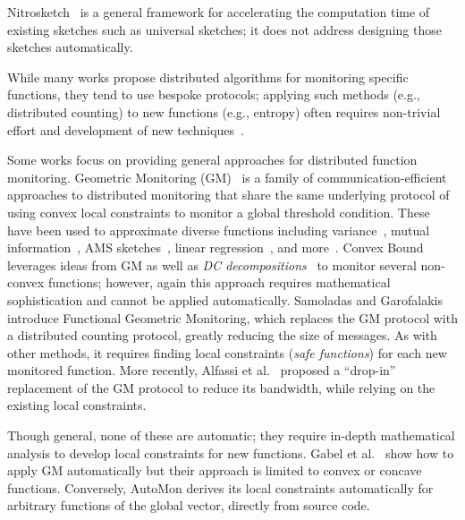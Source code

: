 Nitrosketch~\cite{2019_nitrosketch} is a general framework for accelerating the computation time of existing sketches such as universal sketches; it does not address designing those sketches automatically.


While many works propose distributed algorithms for monitoring specific functions, they tend to use bespoke protocols; applying such methods (e.g., distributed counting) to new functions (e.g., entropy) often requires non-trivial effort and development of new techniques~\cite{cormode2013}.


Some works focus on providing general approaches for distributed function monitoring.
Geometric Monitoring (GM)~\cite{2008_shape_sensitive_gm,lazerson:one_for_all} is a family of communication-efficient approaches to distributed monitoring that share the same underlying protocol of using convex local constraints to monitor a global threshold condition.
These have been used to approximate diverse functions including variance~\cite{gabel:variance_monitoring}, mutual information~\cite{giatrakos2012prediction}, AMS sketches~\cite{garofalakis2013sketch}, linear regression~\cite{gabel:monitoring_least_squares}, and more~\cite{sharfman_2007, lazerson_2015, giatrakos_2014, friedman_2014, keren_2012}.
%
Convex Bound~\cite{lazerson:lightweight_monitoring} leverages ideas from GM as well as \emph{DC decompositions}~\cite{dc_Decomposition} to monitor several non-convex functions; however, again this approach requires mathematical sophistication and cannot be applied automatically.
Samoladas and Garofalakis~\cite{samoladas2019functional} introduce Functional Geometric Monitoring, which replaces the GM protocol with a distributed counting protocol, greatly reducing the size of messages.
As with other methods, it requires finding local constraints (\emph{safe functions}) for each new monitored function.
More recently, Alfassi et al.~\cite{2021_icde_distance_lemma} proposed a ``drop-in'' replacement of the GM protocol to reduce its bandwidth, while relying on the existing local constraints.

Though general, none of these are automatic; they require in-depth mathematical analysis to develop local constraints for new functions.
Gabel et al.~\cite{gabel:entropy_approximation} show how to apply GM automatically but their approach is limited to convex or concave functions.
Conversely, AutoMon derives its local constraints automatically for arbitrary functions of the global vector, directly from source code.



